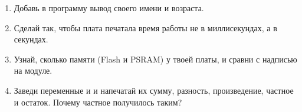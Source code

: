 \begin{tasks}
\begin{enumerate}
  \item Добавь в программу вывод своего имени и возраста.
  \item Сделай так, чтобы плата печатала время работы не в миллисекундах, а в секундах.
  \item Узнай, сколько памяти (Flash и PSRAM) у твоей платы, и сравни с надписью на модуле.
  \item Заведи переменные  и  и напечатай их сумму, разность, произведение, частное и остаток.
        Почему частное получилось таким?
\end{enumerate}
\end{tasks}
